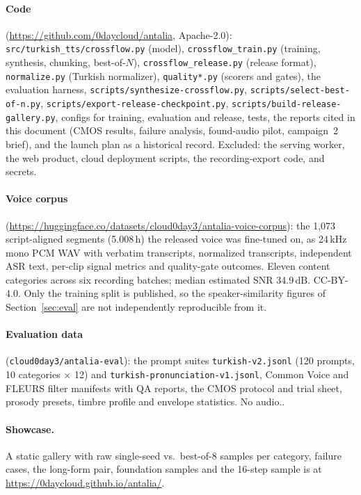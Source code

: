 \documentclass[10pt,twocolumn]{article}
\newcommand{\code}[1]{\texttt{#1}}
\begin{document}
\paragraph{Code} (\url{https://github.com/0daycloud/antalia}, Apache-2.0): \code{src/turkish\_tts/crossflow.py} (model), \code{crossflow\_train.py} (training, synthesis, chunking, best-of-$N$), \code{crossflow\_release.py} (release format), \code{normalize.py} (Turkish normalizer), \code{quality*.py} (scorers and gates), the evaluation harness, \code{scripts/synthesize-crossflow.py}, \code{scripts/select-best-of-n.py}, \code{scripts/export-release-checkpoint.py}, \code{scripts/build-release-gallery.py}, configs for training, evaluation and release, tests, the reports cited in this document (CMOS results, failure analysis, found-audio pilot, campaign~2 brief), and the launch plan as a historical record. Excluded: the serving worker, the web product, cloud deployment scripts, the recording-export code, and secrets.

\paragraph{Voice corpus} (\url{https://huggingface.co/datasets/cloud0day3/antalia-voice-corpus}): the 1,073 script-aligned segments (5.008\,h) the released voice was fine-tuned on, as 24\,kHz mono PCM WAV with verbatim transcripts, normalized transcripts, independent ASR text, per-clip signal metrics and quality-gate outcomes. Eleven content categories across six recording batches; median estimated SNR 34.9\,dB. CC-BY-4.0. Only the training split is published, so the speaker-similarity figures of Section~\ref{sec:eval} are not independently reproducible from it.

\paragraph{Evaluation data} (\code{cloud0day3/antalia-eval}): the prompt suites \code{turkish-v2.jsonl} (120 prompts, 10 categories $\times$ 12) and \code{turkish-pronunciation-v1.jsonl}, Common Voice and FLEURS filter manifests with QA reports, the CMOS protocol and trial sheet, prosody presets, timbre profile and envelope statistics. No audio..

\paragraph{Showcase.} A static gallery with raw single-seed vs.\ best-of-8 samples per category, failure cases, the long-form pair, foundation samples and the 16-step sample is at \url{https://0daycloud.github.io/antalia/}.
\end{document}
